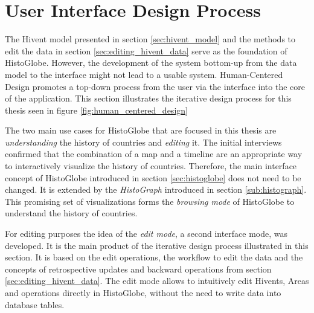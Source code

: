
\section{User Interface Design Process} %
\label{sec:user_interface_design_process}

The Hivent model presented in section \ref{sec:hivent_model} and the methods to edit the data in section \ref{sec:editing_hivent_data} serve as the foundation of HistoGlobe. However, the development of the system bottom-up from the data model to the interface might not lead to a usable system. Human-Centered Design promotes a top-down process from the user via the interface into the core of the application. This section illustrates the iterative design process for this thesis seen in figure \ref{fig:human_centered_design}

The two main use cases for HistoGlobe that are focused in this thesis are \emph{understanding} the history of countries and \emph{editing} it. The initial interviews confirmed that the combination of a map and a timeline are an appropriate way to interactively visualize the history of countries. Therefore, the main interface concept of HistoGlobe introduced in section \ref{sec:histoglobe} does not need to be changed. It is extended by the \emph{HistoGraph} introduced in section \ref{sub:histograph}. This promising set of visualizations forms the \emph{browsing mode} of HistoGlobe to understand the history of countries.

For editing purposes the idea of the \emph{edit mode}, a second interface mode, was developed. It is the main product of the iterative design process illustrated in this section. It is based on the edit operations, the workflow to edit the data and the concepts of retrospective updates and backward operations from section \ref{sec:editing_hivent_data}. The edit mode allows to intuitively edit Hivents, Areas and operations directly in HistoGlobe, without the need to write data into database tables.



